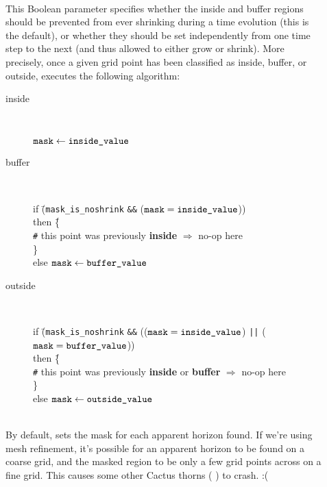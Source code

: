 \begin{description}
\item[]
\mbox{}\\
	This Boolean parameter specifies whether the inside and
	buffer regions should be prevented from ever shrinking
	during a time evolution (this is the default), or whether
	they should be set independently from one time step to the
	next (and thus allowed to either grow or shrink).  More
	precisely, once a given grid point has been classified as
	inside, buffer, or outside,  executes
	the following algorithm:
	\begin{description}
	\item[inside]\mbox{}\\[-\baselineskip]
		\begin{tabbing}
		$\verb|mask| \assign \verb|inside_value|$		  %
		\end{tabbing}
	\item[buffer]\mbox{}\\[-\baselineskip]
		\begin{tabbing}
		if \=(\verb|mask_is_noshrink|
		      \verb|&&|
		      ($\verb|mask| = \verb|inside_value|$))		\+\\
		   then \=\{						\+\\
			\verb|#|
			this point was previously {\bf inside}
			$\Rightarrow$ no-op here			  \\
			\}						\-\\
		   else \>$\verb|mask| \assign \verb|buffer_value|$	\-%
		\end{tabbing}
	\item[outside]\mbox{}\\[-\baselineskip]
		\begin{tabbing}
		if \=(\verb|mask_is_noshrink|
		      \verb|&&|
		      (($\verb|mask| = \verb|inside_value|$)
		       \verb.||. ($\verb|mask| = \verb|buffer_value|$))	\+\\
		   then \=\{						\+\\
			\verb|#|
			this point was previously {\bf inside}
			or {\bf buffer} $\Rightarrow$ no-op here	  \\
			\}						\-\\
		   else \>$\verb|mask| \assign \verb|outside_value|$	\-%
		\end{tabbing}
	\end{description}

\item[]
\mbox{}\\
	By default,  sets the mask for each
	apparent horizon found.  If we're using mesh refinement, it's
	possible for an apparent horizon to be found on a coarse grid,
	and the masked region to be only a few grid points across on
	a fine grid.  This causes some other Cactus thorns
	(\eg{} ) to crash. :(


\end{description}
